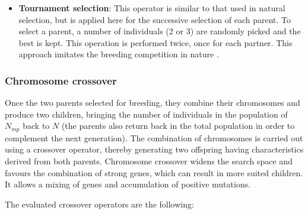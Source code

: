 \documentclass[twocol]{ametsoc}
\begin{document}
\begin{itemize}
	\item \textbf{Tournament selection}: This operator is similar to that used in natural selection, but is applied here for the successive selection of each parent. To select a parent, a number of individuals (2 or 3) are randomly picked and the best is kept. This operation is performed twice, once for each partner. This approach imitates the breeding competition in nature \citep{Haupt2004}.
\end{itemize}


\subsubsection{Chromosome crossover}
			
Once the two parents selected for breeding, they combine their chromosomes and produce two children, bringing the number of individuals in the population of $N_{mp}$ back to $N$ (the parents also return back in the total population in order to complement the next generation). The combination of chromosomes is carried out using a crossover operator, thereby generating two offspring having characteristics derived from both parents. Chromosome crossover widens the search space and favours the combination of strong genes, which can result in more suited children. It allows a mixing of genes and accumulation of positive mutations.

The evaluated crossover operators are the following:
\end{document}
